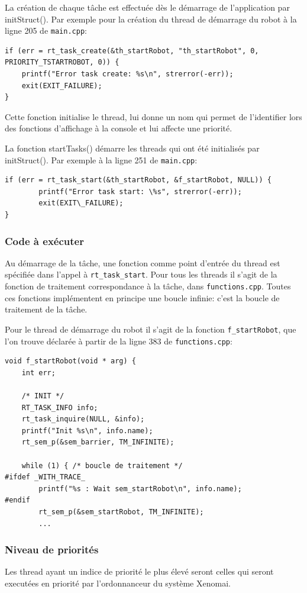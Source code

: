 \documentclass[11pt, a4paper]{paper}
\begin{document}
La création de chaque tâche est effectuée dès le démarrage de l'application par initStruct().
Par exemple pour la création du thread de démarrage du robot à la ligne 205 de {\tt main.cpp}:
\begin{verbatim}
if (err = rt_task_create(&th_startRobot, "th_startRobot", 0, PRIORITY_TSTARTROBOT, 0)) {
    printf("Error task create: %s\n", strerror(-err));
    exit(EXIT_FAILURE);
}
\end{verbatim}
Cette fonction initialise le thread, lui donne un nom qui permet de l'identifier lors des fonctions d'affichage à la console et lui affecte une priorité.

La fonction startTasks() démarre les threads qui ont été initialisés par initStruct(). Par exemple à la ligne 251 de {\tt main.cpp}:
\begin{verbatim}
if (err = rt_task_start(&th_startRobot, &f_startRobot, NULL)) {
        printf("Error task start: \%s", strerror(-err));
        exit(EXIT\_FAILURE);
}
\end{verbatim}
 
\subsubsection{Code à exécuter}
Au démarrage de la tâche, une fonction comme point d'entrée du thread est spécifiée dans l'appel à {\tt rt\_task\_start}. Pour tous les threads il s'agit de la fonction de traitement correspondance à la tâche, dans {\tt functions.cpp}. Toutes ces fonctions implémentent en principe une boucle infinie: c'est la boucle de traitement de la tâche.

Pour le thread de démarrage du robot il s'agit de la fonction {\tt f\_startRobot}, que l'on trouve déclarée à partir de la ligne 383 de {\tt functions.cpp}:

\begin{verbatim}
void f_startRobot(void * arg) {
    int err;

    /* INIT */
    RT_TASK_INFO info;
    rt_task_inquire(NULL, &info);
    printf("Init %s\n", info.name);
    rt_sem_p(&sem_barrier, TM_INFINITE);

    while (1) { /* boucle de traitement */
#ifdef _WITH_TRACE_
        printf("%s : Wait sem_startRobot\n", info.name);
#endif
        rt_sem_p(&sem_startRobot, TM_INFINITE);
        ...
\end{verbatim}

\subsubsection{Niveau de priorités}
Les thread ayant un indice de priorité le plus élevé seront celles qui seront executées en priorité par l'ordonnanceur du système Xenomai.
\end{document}
